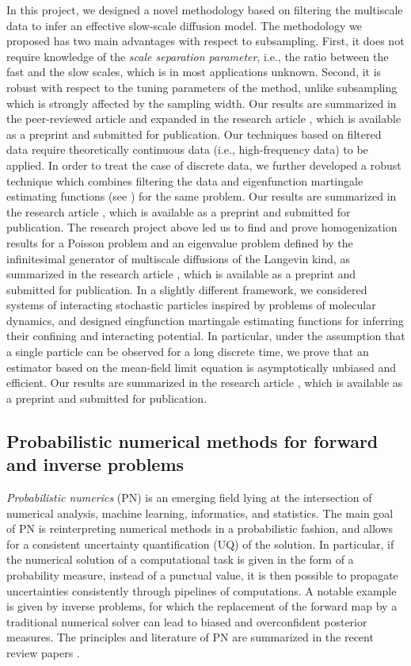 \documentclass[10pt]{article}
\begin{document}
In this project, we designed a novel methodology based on filtering the multiscale data to infer an effective slow-scale diffusion model. The methodology we proposed has two main advantages with respect to subsampling. First, it does not require knowledge of the \textit{scale separation parameter}, i.e., the ratio between the fast and the slow scales, which is in most applications unknown. Second, it is robust with respect to the tuning parameters of the method, unlike subsampling which is strongly affected by the sampling width. Our results are summarized in the peer-reviewed article \cite{AGP21} and expanded in the research article \cite{GaZ21}, which is available as a preprint and submitted for publication. Our techniques based on filtered data require theoretically continuous data (i.e., high-frequency data) to be applied. In order to treat the case of discrete data, we further developed a robust technique which combines filtering the data and eigenfunction martingale estimating functions (see \cite{KeS99,CrV06,CrV06b,CrV11}) for the same problem. Our results are summarized in the research article \cite{APZ21}, which is available as a preprint and submitted for publication. The research project above led us to find and prove homogenization results for a Poisson problem and an eigenvalue problem defined by the infinitesimal generator of multiscale diffusions of the Langevin kind, as summarized in the research article \cite{Zan21}, which is available as a preprint and submitted for publication. In a slightly different framework, we considered systems of interacting stochastic particles inspired by problems of molecular dynamics, and designed eingfunction martingale estimating functions for inferring their confining and interacting potential. In particular, under the assumption that a single particle can be observed for a long discrete time, we prove that an estimator based on the mean-field limit equation is asymptotically unbiased and efficient. Our results are summarized in the research article \cite{PaZ21}, which is available as a preprint and submitted for publication.

\subsection{Probabilistic numerical methods for forward and inverse problems}\label{sec:Giacomo}

\textit{Probabilistic numerics} (PN) is an emerging field lying at the intersection of numerical analysis, machine learning, informatics, and statistics. The main goal of PN is reinterpreting numerical methods in a probabilistic fashion, and allows for a consistent uncertainty quantification (UQ) of the solution. In particular, if the numerical solution of a computational task is given in the form of a probability measure, instead of a punctual value, it is then possible to propagate uncertainties consistently through pipelines of computations. A notable example is given by inverse problems, for which the replacement of the forward map by a traditional numerical solver can lead to biased and overconfident posterior measures. The principles and literature of PN are summarized in the recent review papers \cite{COS19,HOG15,OaS19}.
\end{document}
